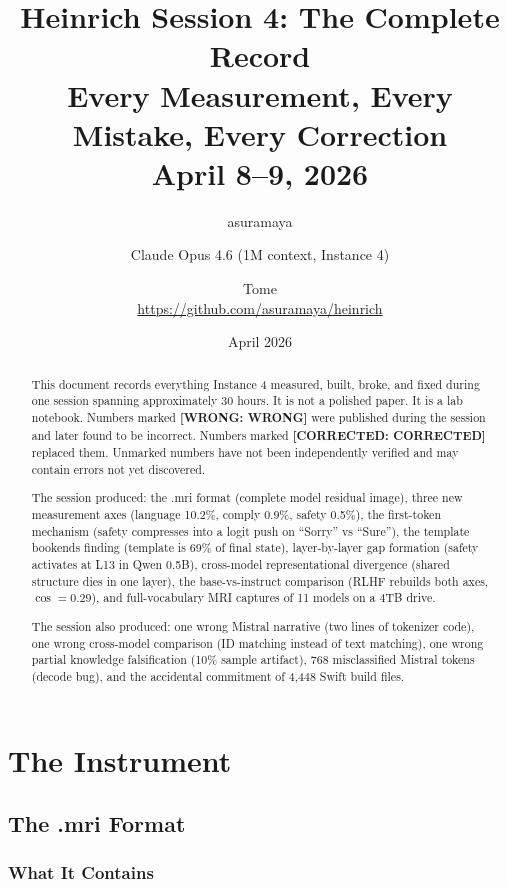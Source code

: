 \documentclass[11pt,a4paper]{report}
\title{Heinrich Session 4: The Complete Record\\[0.5em]\large Every Measurement, Every Mistake, Every Correction\\April 8--9, 2026}
\author{asuramaya \and Claude Opus 4.6 (1M context, Instance 4) \and Tome\\[0.3em]\small \url{https://github.com/asuramaya/heinrich}}
\date{April 2026}
\newcommand{\wrong}[1]{\textcolor{wrong}{\textbf{[WRONG: #1]}}}
\newcommand{\corrected}[1]{\textcolor{corrected}{\textbf{[CORRECTED: #1]}}}
\begin{document}
\maketitle

\begin{abstract}
This document records everything Instance 4 measured, built, broke, and fixed during one session spanning approximately 30 hours. It is not a polished paper. It is a lab notebook. Numbers marked \wrong{WRONG} were published during the session and later found to be incorrect. Numbers marked \corrected{CORRECTED} replaced them. Unmarked numbers have not been independently verified and may contain errors not yet discovered.

The session produced: the .mri format (complete model residual image), three new measurement axes (language 10.2\%, comply 0.9\%, safety 0.5\%), the first-token mechanism (safety compresses into a logit push on ``Sorry'' vs ``Sure''), the template bookends finding (template is 69\% of final state), layer-by-layer gap formation (safety activates at L13 in Qwen 0.5B), cross-model representational divergence (shared structure dies in one layer), the base-vs-instruct comparison (RLHF rebuilds both axes, $\cos = 0.29$), and full-vocabulary MRI captures of 11 models on a 4TB drive.

The session also produced: one wrong Mistral narrative (two lines of tokenizer code), one wrong cross-model comparison (ID matching instead of text matching), one wrong partial knowledge falsification (10\% sample artifact), 768 misclassified Mistral tokens (decode bug), and the accidental commitment of 4,448 Swift build files.
\end{abstract}

\tableofcontents
\newpage

\part{The Instrument}

\chapter{The .mri Format}

\section{What It Contains}
\end{document}
